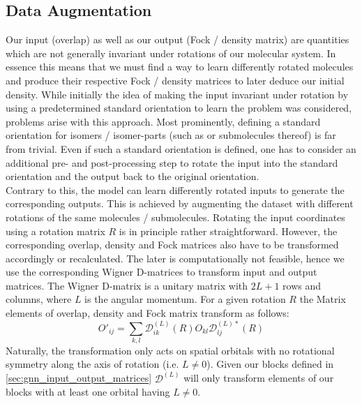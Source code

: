 \subsection{Data Augmentation}
\label{subsec:gnn_data_augmentation}
Our input (overlap) as well as our output (Fock / density matrix) are quantities which are not generally invariant under rotations of our molecular system. In essence this means that we must find a way to learn differently rotated molecules and produce their respective Fock / density matrices to later deduce our initial density. While initially the idea of making the input invariant under rotation by using a predetermined standard orientation to learn the problem was considered, problems arise with this approach. Most prominently, defining a standard orientation for isomers / isomer-parts (such as  or submolecules thereof) is far from trivial. Even if such a standard orientation is defined, one has to consider an additional pre- and post-processing step to rotate the input into the standard orientation and the output back to the original orientation. \\
Contrary to this, the model can learn differently rotated inputs to generate the corresponding outputs. This is achieved by augmenting the dataset with different rotations of the same molecules / submolecules. Rotating the input coordinates using a rotation matrix $R$ is in principle rather straightforward. However, the corresponding overlap, density and Fock matrices also have to be transformed accordingly or recalculated. The later is computationally not feasible, hence we use the corresponding Wigner D-matrices to transform input and output matrices. 
The Wigner D-matrix is a unitary matrix with $2L + 1$ rows and columns, where $L$ is the angular momentum. For a given rotation $R$ the Matrix elements of overlap, density and Fock matrix transform as follows:
\begin{equation}
    O'_{ij} = \sum_{k,l} \mathcal{D}^{(L)}_{ik}(R) O_{kl} \mathcal{D}^{(L)*}_{lj}(R)
\end{equation}
Naturally, the transformation only acts on spatial orbitals with no rotational symmetry along the axis of rotation (i.e. $L \neq 0$). Given our blocks defined in \autoref{sec:gnn_input_output_matrices} $\mathcal{D}^{(L)}$ will only transform elements of our blocks with at least one orbital having $L \neq 0$. \\


